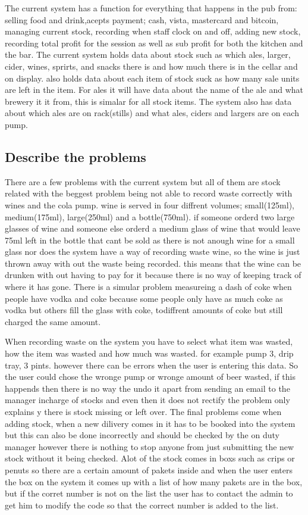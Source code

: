 The current system has a function for everything that happens in the pub from: selling food and drink,acepts payment; cash, vista, mastercard and bitcoin, managing current stock, recording when staff clock on and off, adding new stock, recording total profit for the session as well as sub profit for both the kitchen and the bar. The current system holds data about stock such as which ales, larger, cider, wines, sprirts, and snacks there is and how much there is in the cellar and on display. also holds data about each item of stock suck as how many sale units are left in the item. For ales it will have data about the name of the ale and what brewery it it from, this is simalar for all stock items. The system also has data about which ales are on rack(stills) and what ales, ciders and largers are on each pump.

\subsection{Describe the problems}

There are a few problems with the current system but all of them are stock related with the beggest problem being not able to record waste correctly with wines and the cola pump. wine is served in four diffrent volumes; small(125ml), medium(175ml), large(250ml) and a bottle(750ml). if someone orderd two large glasses of wine and someone else orderd a medium glass of wine that would leave 75ml left in the bottle that cant be sold as there is not anough wine for a small glass nor does the system have a way of recording waste wine, so the wine is just thrown away with out the waste being recorded. this means that the wine can be drunken with out having to pay for it because there is no way of keeping track of where it has gone. There is a simular problem measureing a dash of coke when people have vodka and coke because some people only have as much coke as vodka but others fill the glass with coke, todiffrent amounts of coke but still charged the same amount.

When recording waste on the system you have to select what item was wasted, how the item was wasted and how much was wasted. for example pump 3, drip tray, 3 pints. however there can be errors when the user is entering this data. So the user could chose the wronge pump or wronge amount of beer wasted, if this happends then there is no way the undo it apart from sending an email to the manager incharge of stocks and even then it does not rectify the problem only explains y there is stock missing or left over. The final problems come when adding stock, when a new dilivery comes in it has to be booked into the system but this can also be done incorrectly and should be checked by the on duty manager however there is nothing to stop anyone from just submitting the new stock without it being checked. Alot of the stock comes in boxs such as crips or penuts so there are a certain amount of pakets inside and when the user enters the box on the system it comes up with a list of how many pakets are in the box, but if the corret number is not on the list the user has to contact the admin to get him to modify the code so that the correct number is added to the list.

